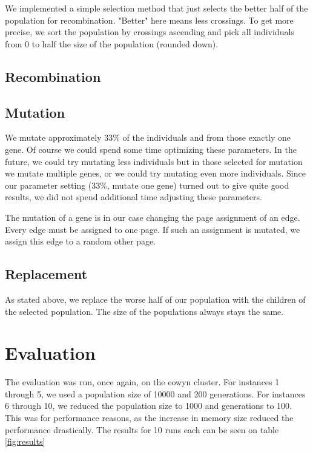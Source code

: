 \documentclass [11pt]{article}
\begin{document}
We implemented a simple selection method that just selects the better half of the population for recombination. "Better" here means less crossings. To get more precise, we sort the population by crossings ascending and pick all individuals from 0 to half the size of the population (rounded down).

\subsection{Recombination}



\subsection{Mutation}

We mutate approximately 33\% of the individuals and from those exactly one gene. Of course we could spend some time optimizing these parameters. In the future, we could try mutating less individuals but in those selected for mutation we mutate multiple genes, or we could try mutating even more individuals. Since our parameter setting (33\%, mutate one gene) turned out to give quite good results, we did not spend additional time adjusting these parameters.

The mutation of a gene is in our case changing the page assignment of an edge. Every edge must be assigned to one page. If such an assignment is mutated, we assign this edge to a random other page.

\subsection{Replacement}

As stated above, we replace the worse half of our population with the children of the selected population. The size of the populations always stays the same.

\section{Evaluation}

The evaluation was run, once again, on the eowyn cluster. For instances 1 through 5, we used a population size of 10000 and 200 generations. For instances 6 through 10, we reduced the population size to 1000 and generations to 100. This was for performance reasons, as the increase in memory size reduced the performance drastically. The results for 10 runs each can be seen on table \ref{fig:results}
\end{document}
